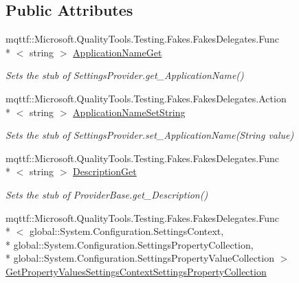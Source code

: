 \subsection*{Public Attributes}
\begin{DoxyCompactItemize}
\item 
mqttf\-::\-Microsoft.\-Quality\-Tools.\-Testing.\-Fakes.\-Fakes\-Delegates.\-Func\\*
$<$ string $>$ \hyperlink{class_system_1_1_configuration_1_1_fakes_1_1_stub_settings_provider_a66d06fd77aff8f0d2276c55386d182df}{Application\-Name\-Get}
\begin{DoxyCompactList}\small\item\em Sets the stub of Settings\-Provider.\-get\-\_\-\-Application\-Name()\end{DoxyCompactList}\item 
mqttf\-::\-Microsoft.\-Quality\-Tools.\-Testing.\-Fakes.\-Fakes\-Delegates.\-Action\\*
$<$ string $>$ \hyperlink{class_system_1_1_configuration_1_1_fakes_1_1_stub_settings_provider_a2ca696950287eeadc1b55264dded6cd5}{Application\-Name\-Set\-String}
\begin{DoxyCompactList}\small\item\em Sets the stub of Settings\-Provider.\-set\-\_\-\-Application\-Name(\-String value)\end{DoxyCompactList}\item 
mqttf\-::\-Microsoft.\-Quality\-Tools.\-Testing.\-Fakes.\-Fakes\-Delegates.\-Func\\*
$<$ string $>$ \hyperlink{class_system_1_1_configuration_1_1_fakes_1_1_stub_settings_provider_a5727f4785893acd46c9d4e115d232b8f}{Description\-Get}
\begin{DoxyCompactList}\small\item\em Sets the stub of Provider\-Base.\-get\-\_\-\-Description()\end{DoxyCompactList}\item 
mqttf\-::\-Microsoft.\-Quality\-Tools.\-Testing.\-Fakes.\-Fakes\-Delegates.\-Func\\*
$<$ global\-::\-System.\-Configuration.\-Settings\-Context, \\*
global\-::\-System.\-Configuration.\-Settings\-Property\-Collection, \\*
global\-::\-System.\-Configuration.\-Settings\-Property\-Value\-Collection $>$ \hyperlink{class_system_1_1_configuration_1_1_fakes_1_1_stub_settings_provider_a8efe867c29d813158499b738ab79a9f5}{Get\-Property\-Values\-Settings\-Context\-Settings\-Property\-Collection}

\end{DoxyCompactItemize}
